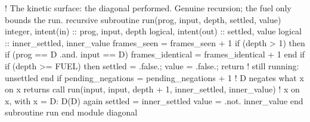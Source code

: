 \documentclass[10pt,twocolumn]{article}
\newenvironment{Shaded}{}{}
\newcommand{\CommentTok}[1]{#1}
\newcommand{\ConstantTok}[1]{#1}
\newcommand{\DataTypeTok}[1]{#1}
\newcommand{\DecValTok}[1]{#1}
\newcommand{\KeywordTok}[1]{#1}
\newcommand{\NormalTok}[1]{#1}
\newcommand{\OperatorTok}[1]{#1}
\providecommand{\CommentTok}[1]{#1}
\providecommand{\ConstantTok}[1]{#1}
\providecommand{\DataTypeTok}[1]{#1}
\providecommand{\DecValTok}[1]{#1}
\providecommand{\KeywordTok}[1]{#1}
\providecommand{\NormalTok}[1]{#1}
\providecommand{\OperatorTok}[1]{#1}
\providecommand{\CommentTok}[1]{#1}
\providecommand{\ConstantTok}[1]{#1}
\providecommand{\DataTypeTok}[1]{#1}
\providecommand{\DecValTok}[1]{#1}
\providecommand{\KeywordTok}[1]{#1}
\providecommand{\NormalTok}[1]{#1}
\providecommand{\OperatorTok}[1]{#1}
\begin{document}
\begin{strip}
\begin{Shaded}
\begin{Highlighting}[]
  \CommentTok{! The kinetic surface: the diagonal performed. Genuine recursion; the fuel only bounds the run.}
  \KeywordTok{recursive} \KeywordTok{subroutine}\NormalTok{ run(prog, input, depth, settled, value)}
    \DataTypeTok{integer}\NormalTok{, }\DataTypeTok{intent(in)}  \DataTypeTok{::}\NormalTok{ prog, input, depth}
    \DataTypeTok{logical}\NormalTok{, }\DataTypeTok{intent(out)} \DataTypeTok{::}\NormalTok{ settled, value}
    \DataTypeTok{logical} \DataTypeTok{::}\NormalTok{ inner\_settled, inner\_value}
\NormalTok{    frames\_seen }\KeywordTok{=}\NormalTok{ frames\_seen }\KeywordTok{+} \DecValTok{1}
    \KeywordTok{if}\NormalTok{ (depth }\OperatorTok{\textgreater{}} \DecValTok{1}\NormalTok{) }\KeywordTok{then}
       \KeywordTok{if}\NormalTok{ (prog }\OperatorTok{==}\NormalTok{ D }\OperatorTok{.and.}\NormalTok{ input }\OperatorTok{==}\NormalTok{ D) frames\_identical }\KeywordTok{=}\NormalTok{ frames\_identical }\KeywordTok{+} \DecValTok{1}
    \KeywordTok{end if}
    \KeywordTok{if}\NormalTok{ (depth }\OperatorTok{\textgreater{}=}\NormalTok{ FUEL) }\KeywordTok{then}
\NormalTok{       settled }\KeywordTok{=} \ConstantTok{.false.}\NormalTok{;  value }\KeywordTok{=} \ConstantTok{.false.}\NormalTok{;  }\KeywordTok{return}          \CommentTok{! still running: unsettled}
    \KeywordTok{end if}
\NormalTok{    pending\_negations }\KeywordTok{=}\NormalTok{ pending\_negations }\KeywordTok{+} \DecValTok{1}                \CommentTok{! D negates what x on x returns}
    \KeywordTok{call}\NormalTok{ run(input, input, depth }\KeywordTok{+} \DecValTok{1}\NormalTok{, inner\_settled, inner\_value)   }\CommentTok{! x on x, with x = D: D(D) again}
\NormalTok{    settled }\KeywordTok{=}\NormalTok{ inner\_settled}
\NormalTok{    value }\KeywordTok{=} \OperatorTok{.not.}\NormalTok{ inner\_value}
  \KeywordTok{end subroutine}\NormalTok{ run}
\KeywordTok{end module}\NormalTok{ diagonal}


\end{Highlighting}
\end{Shaded}
\end{strip}
\end{document}

